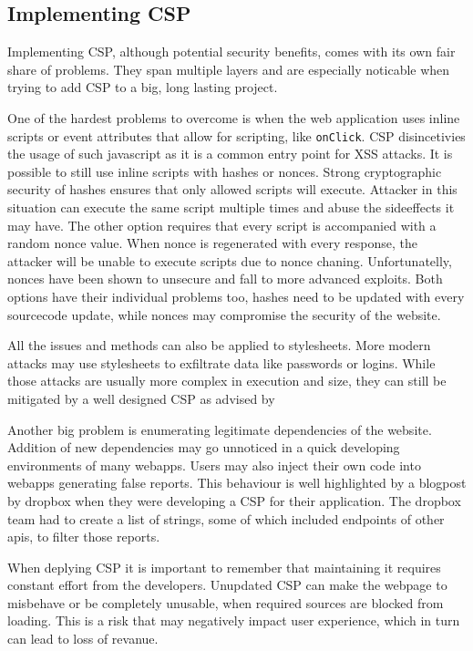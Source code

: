 \documentclass[11]{article}   %
\begin{document}

\subsection{Implementing CSP}
Implementing CSP, although potential security benefits, comes with its own fair share of problems. 
They span multiple layers and are especially noticable when trying to add CSP to a big, long lasting project.

One of the hardest problems to overcome is when the web application uses inline scripts or event attributes that allow for scripting, like \texttt{onClick}.
CSP disincetivies the usage of such javascript as it is a common entry point for XSS attacks. 
It is possible to still use inline scripts with hashes or nonces. 
Strong cryptographic security of hashes ensures that only allowed scripts will execute. 
Attacker in this situation can execute the same script multiple times and abuse the sideeffects it may have.
The other option requires that every script is accompanied with a random nonce value.
When nonce is regenerated with every response, the attacker will be unable to execute scripts due to nonce chaning.
Unfortunatelly, nonces have been shown to unsecure and fall to more advanced exploits. \cite{??}
Both options have their individual problems too, hashes need to be updated with every sourcecode update, while nonces may compromise the security of the website.

All the issues and methods can also be applied to stylesheets.
More modern attacks may use stylesheets to exfiltrate data like passwords or logins.
While those attacks are usually more complex in execution and size, they can still be mitigated by a well designed CSP as advised by \cite{??}

Another big problem is enumerating legitimate dependencies of the website.
Addition of new dependencies may go unnoticed in a quick developing environments of many webapps.
Users may also inject their own code into webapps generating false reports.
This behaviour is well highlighted by a blogpost by dropbox when they were developing a CSP for their application.
The dropbox team had to create a list of strings, some of which included endpoints of other apis, to filter those reports.

When deplying CSP it is important to remember that maintaining it requires constant effort from the developers.
Unupdated CSP can make the webpage to misbehave or be completely unusable, when required sources are blocked from loading.
This is a risk that may negatively impact user experience, which in turn can lead to loss of revanue.
\end{document}
